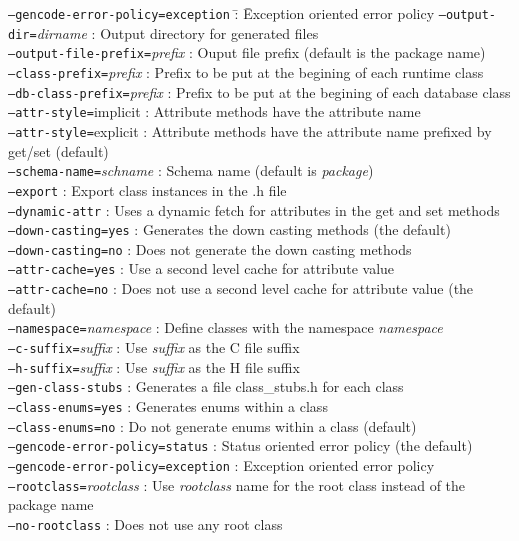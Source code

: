 \begin{tabbing}
\texttt{--gencode-error-policy=exception} \= : \= Exception oriented error policy\kill
\texttt{--output-dir=}\emph{dirname}       \> : \> Output directory for generated files\\
\texttt{--output-file-prefix=}\emph{prefix}\> : \> Ouput file prefix (default is the package name)\\
\texttt{--class-prefix=}\emph{prefix}     \> : \>  Prefix to be put at the begining of each runtime class\\
\texttt{--db-class-prefix=}\emph{prefix}  \> : \>  Prefix to be put at the begining of each database class\\
\texttt{--attr-style=}implicit       \> : \>  Attribute methods have the attribute name\\
\texttt{--attr-style=}explicit       \> : \>  Attribute methods have the attribute name prefixed by get/set (default)\\
\texttt{--schema-name=}\emph{schname}     \> : \>  Schema name (default is \emph{package})\\
\texttt{--export}                    \> : \>  Export class instances in the .h file\\
\texttt{--dynamic-attr}              \> : \>  Uses a dynamic fetch for attributes in the get and set methods\\
\texttt{--down-casting=yes}          \> : \>  Generates the down casting methods (the default)\\
\texttt{--down-casting=no}           \> : \>  Does not generate the down casting methods\\
\texttt{--attr-cache=yes}            \> : \>  Use a second level cache for attribute value\\
\texttt{--attr-cache=no}             \> : \>  Does not use a second level cache for attribute value (the default)\\
\texttt{--namespace=}\emph{namespace}     \> : \>  Define classes with the namespace \emph{namespace}\\
\texttt{--c-suffix=}\emph{suffix}         \> : \>  Use \emph{suffix} as the C file suffix\\
\texttt{--h-suffix=}\emph{suffix}         \> : \>  Use \emph{suffix} as the H file suffix\\
\texttt{--gen-class-stubs}           \> : \>  Generates a file class\_stubs.h for each class\\
\texttt{--class-enums=yes}           \> : \>  Generates enums within a class\\
\texttt{--class-enums=no}            \> : \>  Do not generate enums within a class (default)\\
\texttt{--gencode-error-policy=status}\> : \> Status oriented error policy (the default)\\
\texttt{--gencode-error-policy=exception} \> : \> Exception oriented error policy\\
\texttt{--rootclass=}\emph{rootclass}     \> : \>  Use \emph{rootclass} name for the root class instead of the package name\\
\texttt{--no-rootclass}           \> : \>     Does not use any root class\\
\end{tabbing}

